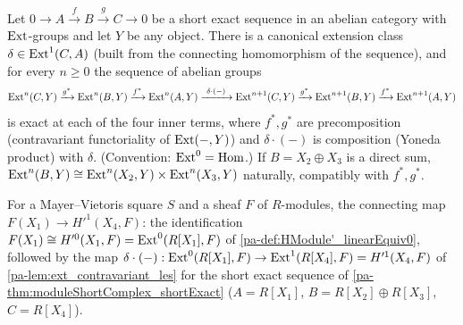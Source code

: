 \begin{lemma}
  \label{pa-lem:ext_contravariant_les}
  \mathlibok

  Let \(0 \to A \xrightarrow{f} B \xrightarrow{g} C \to 0\) be a short exact sequence in an
  abelian category with \(\operatorname{Ext}\)-groups and let \(Y\) be any object. There is a canonical
  extension class \(\delta \in \operatorname{Ext}^1(C, A)\) (built from the connecting homomorphism of the
  sequence), and for every \(n \ge 0\) the sequence of abelian groups
  \[
    \operatorname{Ext}^n(C,Y) \xrightarrow{g^*} \operatorname{Ext}^n(B,Y) \xrightarrow{f^*} \operatorname{Ext}^n(A,Y)
      \xrightarrow{\ \delta \cdot (-)\ } \operatorname{Ext}^{n+1}(C,Y) \xrightarrow{g^*} \operatorname{Ext}^{n+1}(B,Y)
      \xrightarrow{f^*} \operatorname{Ext}^{n+1}(A,Y)
  \]
  is exact at each of the four inner terms, where \(f^*, g^*\) are precomposition
  (contravariant functoriality of \(\operatorname{Ext}(-,Y)\)) and \(\delta \cdot (-)\) is composition
  (Yoneda product) with \(\delta\). (Convention: \(\operatorname{Ext}^0 = \operatorname{Hom}\).) If \(B = X_2 \oplus X_3\)
  is a direct sum, \(\operatorname{Ext}^n(B,Y) \cong \operatorname{Ext}^n(X_2,Y) \times \operatorname{Ext}^n(X_3,Y)\) naturally,
  compatibly with \(f^*, g^*\).
\end{lemma}

\begin{definition}
  \label{pa-def:moduleDelta}
  \leanok

  For a Mayer--Vietoris square \(S\) and a sheaf \(F\) of \(R\)-modules, the connecting map
  \(F(X_1) \to H'^1(X_4, F)\): the identification
  \(F(X_1) \cong H'^0(X_1,F) = \operatorname{Ext}^0(R[X_1], F)\) of \ref{pa-def:HModule'_linearEquiv0},
  followed by the map \(\delta \cdot (-) : \operatorname{Ext}^0(R[X_1],F) \to \operatorname{Ext}^1(R[X_4],F) = H'^1(X_4,F)\)
  of \ref{pa-lem:ext_contravariant_les} for the short exact sequence of
  \ref{pa-thm:moduleShortComplex_shortExact} (\(A = R[X_1]\), \(B = R[X_2] \oplus R[X_3]\),
  \(C = R[X_4]\)).
\end{definition}

